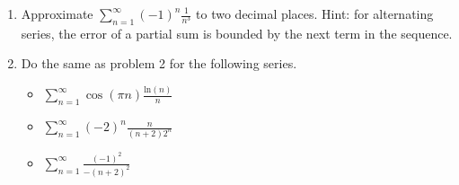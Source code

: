 \documentclass[12pt]{article}
\begin{document}
\begin{enumerate}
\begin{enumerate}
\vfill

%


\item $\displaystyle\sum_{n=1}^{\infty} (-1)^{n-1} \frac{7^n+1}{2^n}$

\vfill

\newpage

\item $\displaystyle\sum_{n=1}^{\infty} (-1)^n \ln(n)$

\vfill

\end{enumerate} 

\item Approximate $\displaystyle\sum_{n=1}^{\infty} (-1)^n \displaystyle\frac{1}{n^3}$
to two decimal places.  Hint: for alternating series, the error of a partial sum is bounded by the next term in the sequence.
\vfill

\pagebreak
\item Do the same as problem 2 for the following series.
\begin{itemize}
\item $\displaystyle\sum_{n=1}^\infty \cos(\pi n) \frac{\mathrm{ln}(n)}{n}$
\vfill

\item $\displaystyle\sum_{n=1}^\infty (-2)^n \frac{n}{(n+2)2^n}$
\vfill

\item $\displaystyle\sum_{n=1}^\infty \frac{(-1)^2}{-(n+2)^2}$
\end{itemize}
\vfill
\end{enumerate}
\end{document}
